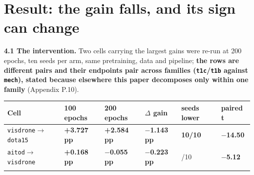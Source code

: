 \documentclass[pdflatex,sn-mathphys-ay]{sn-jnl}
\begin{document}
\section{Result: the gain falls, and its sign can change}%

\textbf{4.1 The intervention.} Two cells carrying the largest gains were re-run at 200 epochs, ten seeds per arm, same pretraining, data and pipeline; \textbf{the rows are different pairs and their endpoints pair across families (\texttt{t1c}/\texttt{t1b} against \texttt{mech}), stated because elsewhere this paper decomposes only within one family} (Appendix P.10).

{\footnotesize
\setlength{\tabcolsep}{4pt}
\begin{longtable}{p{}p{}p{}p{}>{\raggedleft\arraybackslash}p{}>{\raggedleft\arraybackslash}p{}}
\toprule
Cell & 100 epochs & 200 epochs & \ensuremath{\Delta} gain & seeds lower & paired t \\
\midrule
\endhead
\texttt{visdrone\ensuremath{\rightarrow}dota15} & \textbf{+3.727 pp} & \textbf{+2.584 pp} & \textbf{\ensuremath{-}1.143 pp} & \textbf{10/10} & \textbf{\ensuremath{-}14.50} \\
\texttt{aitod\ensuremath{\rightarrow}visdrone} & \textbf{+0.168 pp} & \textbf{\ensuremath{-}0.055 pp} & \textbf{\ensuremath{-}0.223 pp} & 9/10 & \textbf{\ensuremath{-}5.12} \\
\botrule
\end{longtable}}
\end{document}
